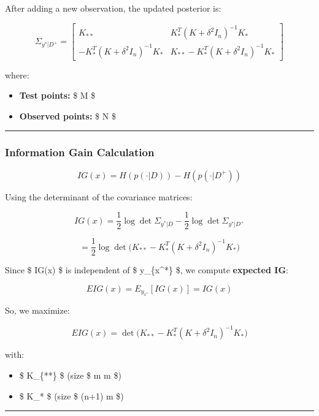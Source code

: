 \documentclass[
  letterpaper,
  DIV=11,
  numbers=noendperiod]{scrartcl}
\providecommand{\tightlist}{%
  \setlength{\itemsep}{0pt}\setlength{\parskip}{0pt}}\usepackage{longtable,booktabs,array}
\begin{document}
After adding a new observation, the updated posterior is:

\[
\Sigma_{y^*|D^+} =
\begin{bmatrix}
K_{**} & K_*^T (K + \delta^2 I_n)^{-1} K_* \\
- K_*^T (K + \delta^2 I_n)^{-1} K_* & K_{**} - K_*^T (K + \delta^2 I_n)^{-1} K_*
\end{bmatrix}
\]

where:

\begin{itemize}
\tightlist
\item
  \textbf{Test points:} \$ M \$
\item
  \textbf{Observed points:} \$ N \$
\end{itemize}

\begin{center}\rule{0.5\linewidth}{0.5pt}\end{center}

\hypertarget{information-gain-calculation}{%
\subsubsection{Information Gain
Calculation}\label{information-gain-calculation}}

\[
IG(x) = H(p(\cdot | D)) - H(p(\cdot | D^+))
\]

Using the determinant of the covariance matrices:

\[
IG(x) = \frac{1}{2} \log \det \Sigma_{y^*|D} - \frac{1}{2} \log \det \Sigma_{y^*|D^+}
\]

\[
= \frac{1}{2} \log \det \Big( K_{**} - K_*^T (K + \delta^2 I_n)^{-1} K_* \Big)
\]

Since \$ IG(x) \$ is independent of \$ y\_\{x\^{}*\} \$, we compute
\textbf{expected IG}:

\[
EIG(x) = E_{y_{x^*}}[IG(x)] = IG(x)
\]

So, we maximize:

\[
EIG(x) = \det \Big( K_{**} - K_*^T (K + \delta^2 I_n)^{-1} K_* \Big)
\]

with:

\begin{itemize}
\tightlist
\item
  \$ K\_\{**\} \$ (size \$ m \times m \$)
\item
  \$ K\_* \$ (size \$ (n+1) \times m \$)
\end{itemize}

\begin{center}\rule{0.5\linewidth}{0.5pt}\end{center}
\end{document}
